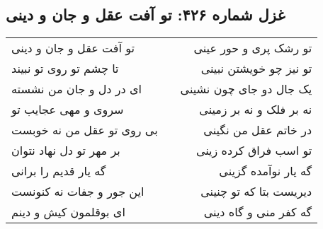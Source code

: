 \begin{center}
\section*{غزل شماره ۴۲۶: تو آفت عقل و جان و دینی}
\label{sec:426}
\begin{longtable}{l p{0.5cm} r}
تو آفت عقل و جان و دینی
&&
تو رشک پری و حور عینی
\\
تا چشم تو روی تو نبیند
&&
تو نیز چو خویشتن نبینی
\\
ای در دل و جان من نشسته
&&
یک جال دو جای چون نشینی
\\
سروی و مهی عجایب تو
&&
نه بر فلک و نه بر زمینی
\\
بی روی تو عقل من نه خوبست
&&
در خاتم عقل من نگینی
\\
بر مهر تو دل نهاد نتوان
&&
تو اسب فراق کرده زینی
\\
گه یار قدیم را برانی
&&
گه یار نوآمده گزینی
\\
این جور و جفات نه کنونست
&&
دیریست بتا که تو چنینی
\\
ای بوقلمون کیش و دینم
&&
گه کفر منی و گاه دینی
\\
\end{longtable}
\end{center}
